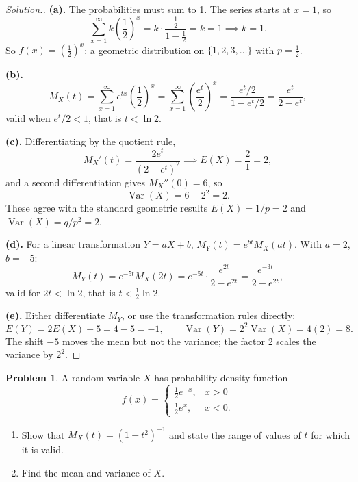 \documentclass[12pt,a4paper]{report}
\theoremstyle{definition}
\theoremstyle{plain}
\theoremstyle{definition}
\newtheorem{problemx}{Problem}[section]
\newenvironment{problem}{\begin{problemx}}{\end{problemx}}
\newenvironment{solution}
  {\renewcommand{\qedsymbol}{}\begin{proof}[\textit{Solution}.]}
  {\end{proof}}
\begin{document}
\begin{solution}
\textbf{(a).} The probabilities must sum to 1. The series starts at $x=1$, so
\[\sum_{x=1}^{\infty}k\left(\frac{1}{2}\right)^{x}
 = k\cdot\frac{\frac12}{1-\frac12} = k = 1 \implies k = 1.\]
So $f(x) = \left(\tfrac12\right)^{x}$: a geometric distribution on $\{1,2,3,\ldots\}$
with $p = \tfrac12$.

\textbf{(b).} \[M_X(t) = \sum_{x=1}^{\infty}e^{tx}\left(\frac{1}{2}\right)^{x}
 = \sum_{x=1}^{\infty}\left(\frac{e^{t}}{2}\right)^{x}
 = \frac{e^{t}/2}{1-e^{t}/2} = \frac{e^{t}}{2-e^{t}},\]
valid when $e^{t}/2<1$, that is $t<\ln 2$.

\textbf{(c).} Differentiating by the quotient rule,
\[M_X'(t) = \frac{2e^{t}}{\left(2-e^{t}\right)^{2}} \implies E(X) = \frac{2}{1} = 2,\]
and a second differentiation gives $M_X''(0) = 6$, so
\[\operatorname{Var}(X) = 6-2^{2} = 2.\]
These agree with the standard geometric results $E(X)=1/p = 2$ and
$\operatorname{Var}(X) = q/p^{2} = 2$.

\textbf{(d).} For a linear transformation $Y = aX+b$,
$M_Y(t) = e^{bt}M_X(at)$. With $a=2$, $b=-5$:
\[M_Y(t) = e^{-5t}M_X(2t) = e^{-5t}\cdot\frac{e^{2t}}{2-e^{2t}}
 = \frac{e^{-3t}}{2-e^{2t}},\]
valid for $2t<\ln 2$, that is $t<\tfrac{1}{2}\ln 2$.

\textbf{(e).} Either differentiate $M_Y$, or use the transformation rules directly:
\[E(Y) = 2E(X)-5 = 4-5 = -1, \qquad
\operatorname{Var}(Y) = 2^{2}\operatorname{Var}(X) = 4(2) = 8.\]
The shift $-5$ moves the mean but not the variance; the factor 2 scales the variance by
$2^{2}$.
\end{solution}

\begin{problem}
A random variable $X$ has probability density function
\[f(x) = \begin{cases}
\frac{1}{2}e^{-x}, & x>0\\[2pt]
\frac{1}{2}e^{x}, & x<0.
\end{cases}\]
\begin{enumerate}
\item[(a).] Show that $M_X(t) = \left(1-t^{2}\right)^{-1}$ and state the range of values
of $t$ for which it is valid.
\item[(b).] Find the mean and variance of $X$.
\end{enumerate}
\end{problem}
\end{document}
